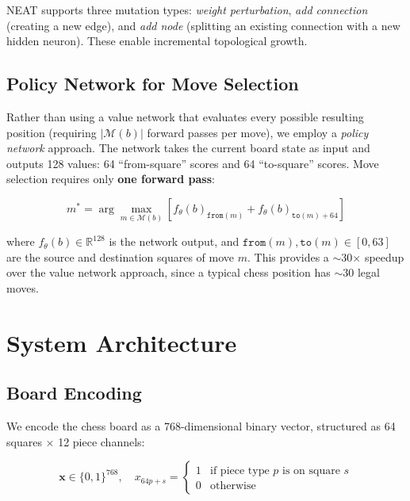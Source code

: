 \documentclass[11pt, twocolumn]{article}
\begin{document}
NEAT supports three mutation types: \emph{weight perturbation}, \emph{add connection} (creating a new edge), and \emph{add node} (splitting an existing connection with a new hidden neuron). These enable incremental topological growth.

\subsection{Policy Network for Move Selection}
Rather than using a value network that evaluates every possible resulting position (requiring $|\mathcal{M}(b)|$ forward passes per move), we employ a \emph{policy network} approach. The network takes the current board state as input and outputs 128 values: 64 ``from-square'' scores and 64 ``to-square'' scores. Move selection requires only \textbf{one forward pass}:

\begin{equation}
    m^* = \arg\max_{m \in \mathcal{M}(b)} \left[ f_\theta(b)_{\texttt{from}(m)} + f_\theta(b)_{\texttt{to}(m) + 64} \right]
    \label{eq:move_selection}
\end{equation}

where $f_\theta(b) \in \mathbb{R}^{128}$ is the network output, and $\texttt{from}(m), \texttt{to}(m) \in [0, 63]$ are the source and destination squares of move $m$. This provides a $\sim$30$\times$ speedup over the value network approach, since a typical chess position has $\sim$30 legal moves.

\section{System Architecture}
\label{sec:architecture}

\subsection{Board Encoding}
We encode the chess board as a 768-dimensional binary vector, structured as 64 squares $\times$ 12 piece channels:

\begin{equation}
    \mathbf{x} \in \{0, 1\}^{768}, \quad x_{64p + s} = 
    \begin{cases}
        1 & \text{if piece type } p \text{ is on square } s \\
        0 & \text{otherwise}
    \end{cases}
\end{equation}
\end{document}
